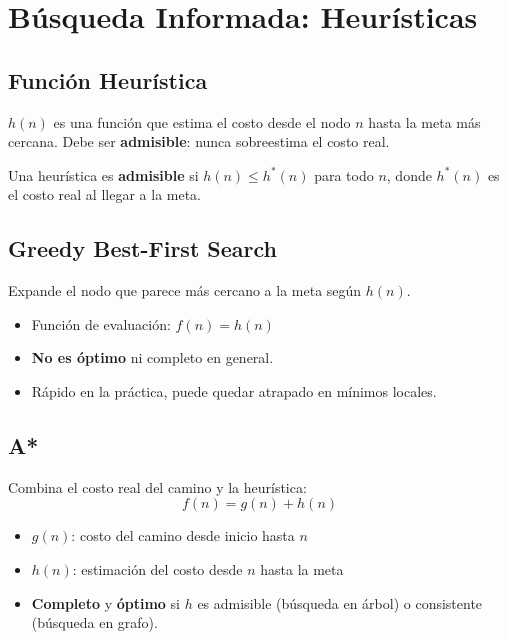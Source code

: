 \section{Búsqueda Informada: Heurísticas}

\subsection{Función Heurística}

\begin{definition}[Heurística]
$h(n)$ es una función que estima el costo desde el nodo $n$ hasta la meta más cercana. Debe ser \textbf{admisible}: nunca sobreestima el costo real.
\end{definition}

\begin{remark}
Una heurística es \textbf{admisible} si $h(n) \leq h^*(n)$ para todo $n$, donde $h^*(n)$ es el costo real al llegar a la meta.
\end{remark}

\subsection{Greedy Best-First Search}

Expande el nodo que parece más cercano a la meta según $h(n)$.
\begin{itemize}
    \item Función de evaluación: $f(n) = h(n)$
    \item \textbf{No es óptimo} ni completo en general.
    \item Rápido en la práctica, puede quedar atrapado en mínimos locales.
\end{itemize}

\subsection{A*}

Combina el costo real del camino y la heurística:
$$f(n) = g(n) + h(n)$$

\begin{itemize}
    \item $g(n)$: costo del camino desde inicio hasta $n$
    \item $h(n)$: estimación del costo desde $n$ hasta la meta
    \item \textbf{Completo} y \textbf{óptimo} si $h$ es admisible (búsqueda en árbol) o consistente (búsqueda en grafo).
\end{itemize}

